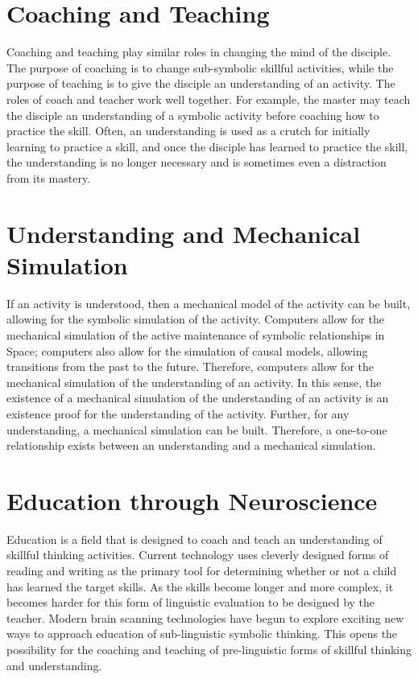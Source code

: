 \section{Coaching and Teaching}

Coaching and teaching play similar roles in changing the mind of the
disciple.  The purpose of coaching is to change sub-symbolic skillful
activities, while the purpose of teaching is to give the disciple an
understanding of an activity.  The roles of coach and teacher work
well together.  For example, the master may teach the disciple an
understanding of a symbolic activity before coaching how to practice
the skill.  Often, an understanding is used as a crutch for initially
learning to practice a skill, and once the disciple has learned to
practice the skill, the understanding is no longer necessary and is
sometimes even a distraction from its mastery.

\section{Understanding and Mechanical Simulation}

If an activity is understood, then a mechanical model of the activity
can be built, allowing for the symbolic simulation of the activity.
Computers allow for the mechanical simulation of the active
maintenance of symbolic relationships in Space; computers also allow
for the simulation of causal models, allowing transitions from the
past to the future.  Therefore, computers allow for the mechanical
simulation of the understanding of an activity.  In this sense, the
existence of a mechanical simulation of the understanding of an
activity is an existence proof for the understanding of the activity.
Further, for any understanding, a mechanical simulation can be built.
Therefore, a one-to-one relationship exists between an understanding
and a mechanical simulation.

\section{Education through Neuroscience}

Education is a field that is designed to coach and teach an
understanding of skillful thinking activities.  Current technology
uses cleverly designed forms of reading and writing as the primary
tool for determining whether or not a child has learned the target
skills.  As the skills become longer and more complex, it becomes
harder for this form of linguistic evaluation to be designed by the
teacher.  Modern brain scanning technologies have begun to explore
exciting new ways to approach education of sub-linguistic symbolic
thinking.  This opens the possibility for the coaching and teaching of
pre-linguistic forms of skillful thinking and understanding.


